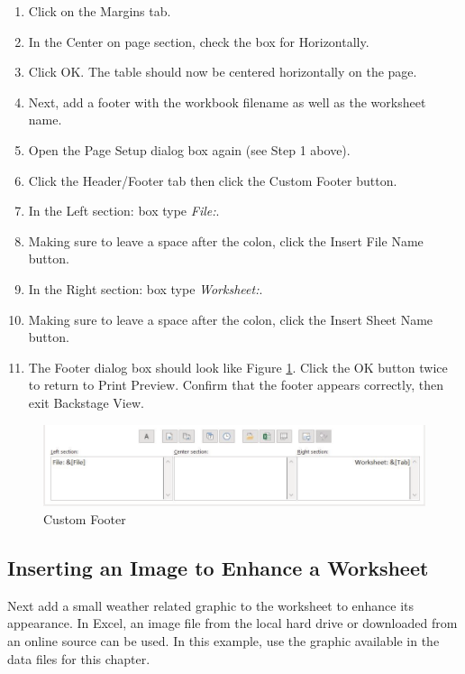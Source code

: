 \begin{enumerate}[resume]
	\item Click on the Margins tab.
	\item In the Center on page section, check the box for Horizontally.
	\item Click OK. The table should now be centered horizontally on the page.
	\item Next, add a footer with the workbook filename as well as the worksheet name.
	\item Open the Page Setup dialog box again (see Step 1 above).
	\item Click the Header/Footer tab then click the Custom Footer button.
	\item In the Left section: box type \textit{File:}.
	\item Making sure to leave a space after the colon, click the Insert File Name button.
	\item In the Right section: box type \textit{Worksheet:}.
	\item Making sure to leave a space after the colon, click the Insert Sheet Name button.
	\item The Footer dialog box should look like Figure \ref{05:fig27}. Click the OK button twice to return to Print Preview. Confirm that the footer appears correctly, then exit Backstage View.
\end{enumerate}

\begin{figure}[H]
	\centering
	\includegraphics[width=\maxwidth{.95\linewidth}]{gfx/ch05_fig27}
	\caption{Custom Footer}
	\label{05:fig27}
\end{figure}

\subsection{Inserting an Image to Enhance a Worksheet}

Next add a small weather related graphic to the worksheet to enhance its appearance. In Excel, an image file from the local hard drive or downloaded from an online source can be used. In this example, use the graphic available in the data files for this chapter.

